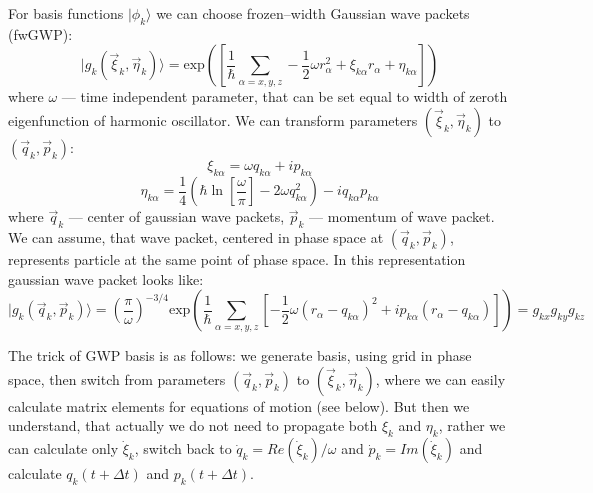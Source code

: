 For basis functions $|\phi_k\rangle$ we can choose frozen--width Gaussian wave packets (fwGWP):
$$|g_k(\vec{\xi}_k,\vec{\eta}_k)\rangle=\text{exp}\left(\left[\frac{1}{\hbar}\sum_{\alpha=x,y,z}-\frac{1}{2}\omega r_{\alpha}^2+\xi_{k\alpha}r_{\alpha}+\eta_{k\alpha}\right]\right)$$
where $\omega$ --- time independent parameter, that can be set equal to width of zeroth eigenfunction of harmonic oscillator.
We can transform parameters $(\vec{\xi}_k,\vec{\eta}_k)$ to $(\vec{q}_k,\vec{p}_k)$: 
$$\xi_{k\alpha} = \omega q_{k\alpha}+i p_{k\alpha}$$
$$\eta_{k\alpha} = \frac{1}{4}\left(\hbar\ln\left[{\frac{\omega}{\pi}}\right]-2\omega q_{k\alpha}^2\right)-iq_{k\alpha}p_{k\alpha}$$
where $\vec{q}_k$ --- center of gaussian wave packets, $\vec{p}_k$ --- momentum of wave packet. 
We can assume, that wave packet, centered in phase space at $(\vec{q}_k,\vec{p}_k)$, represents particle at the same point of phase space.
In this representation gaussian wave packet looks like:
$$|g_k(\vec{q}_{k},\vec{p}_{k})\rangle = \left(\frac{\pi}{\omega}\right)^{-3/4} \text{exp}\left(\frac{1}{\hbar}\sum_{\alpha=x,y,z}\left[-\frac{1}{2}\omega(r_{\alpha}-q_{k\alpha})^2+%
									 ip_{k\alpha}(r_{\alpha}-q_{k\alpha})\right]\right)=g_{kx}g_{ky}g_{kz}$$

The trick of GWP basis is as follows: we generate basis, using grid in phase space, 
then switch from parameters $(\vec{q}_k,\vec{p}_k)$ to $(\vec{\xi}_k,\vec{\eta}_k)$, 
where we can easily calculate matrix elements for equations of motion (see below).
But then we understand, that actually we do not need to propagate both $\xi_k$ and $\eta_k$,
rather we can calculate only $\dot{\xi}_k$, switch back to $\dot{q}_k=\mathit{Re}(\dot{\xi}_k)/\omega$ 
and $\dot{p}_k=\mathit{Im}(\dot{\xi}_k)$ and calculate $q_k(t+\Delta t)$ and $p_k(t+\Delta t)$.

